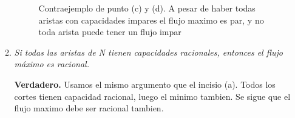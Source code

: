 \documentclass{article}
\begin{document}
\begin{enumerate}
\begin{enumerate}
\begin{figure}[ht]
    \caption{Contraejemplo de punto (c) y (d). A pesar de haber todas aristas con capacidades impares el flujo maximo es par, y no toda arista puede tener un flujo impar}
    \label{fig:flow_graph_redrawn}
\end{figure}

		\item \textit{Si todas las aristas de N tienen capacidades racionales, entonces el flujo máximo es racional.}
		
			\textbf{Verdadero.} Usamos el mismo argumento que el incisio (a). Todos los cortes tienen capacidad racional, luego el minimo tambien. Se sigue que el flujo maximo debe ser racional tambien.
\end{enumerate}
\end{enumerate}
\end{document}
